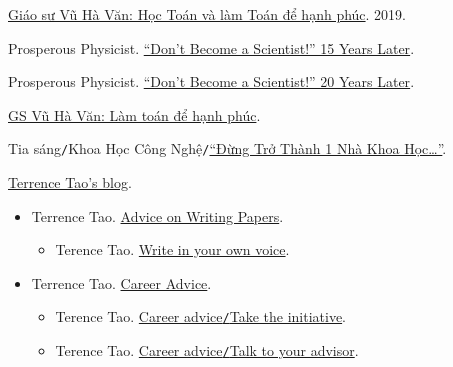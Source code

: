 \documentclass{article}
\numberwithin{equation}{section}
\begin{document}
\begin{thebibliography}{99}
	 \href{https://www.mathvn.com/2019/03/giao-su-vu-ha-van-hoc-toan-va-lam-toan.html}{Giáo sư Vũ Hà Văn: Học Toán và làm Toán để hạnh phúc}. 2019.
	
	 Prosperous Physicist. \href{https://www.prosperousphysicist.com/dont-become-a-scientist-15-years-later/}{``Don't Become a Scientist!'' 15 Years Later}.
	
	 Prosperous Physicist. \href{http://www.prosperousphysicist.com/dont-become-a-scientist-20-years-later/}{``Don't Become a Scientist!'' 20 Years Later}.
	
	 \href{https://thanhnien.vn/gs-vu-ha-van-lam-toan-de-hanh-phuc-post15849.html}{GS Vũ Hà Văn: Làm toán để hạnh phúc}.
	
	 Tia sáng\texttt{/}Khoa Học Công Nghệ\texttt{/}\href{https://tiasang.com.vn/khoa-hoc-cong-nghe/dung-tro-thanh-mot-nha-khoa-hoc-903}{``Đừng Trở Thành 1 Nhà Khoa Học\ldots''}.
	
	 \href{https://terrytao.wordpress.com/}{Terrence Tao's blog}.
	\begin{itemize}
		\item Terrence Tao. \href{https://terrytao.wordpress.com/advice-on-writing-papers/}{Advice on Writing Papers}.
		\begin{itemize}
			\item Terence Tao. \href{https://terrytao.wordpress.com/advice-on-writing-papers/write-in-your-own-voice/}{Write in your own voice}.
		\end{itemize}
		\item Terrence Tao. \href{https://terrytao.wordpress.com/career-advice/}{Career Advice}.
		\begin{itemize}
			\item Terence Tao. \href{https://terrytao.wordpress.com/career-advice/take-the-initiative/}{Career advice\texttt{/}Take the initiative}.
			\item Terence Tao. \href{https://terrytao.wordpress.com/career-advice/talk-to-your-advisor/}{Career advice\texttt{/}Talk to your advisor}.
		\end{itemize}
	\end{itemize}
	

\end{thebibliography}
\end{document}
